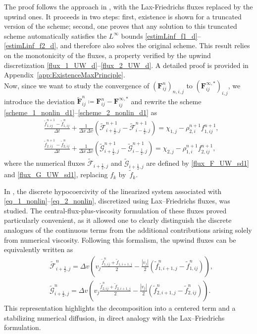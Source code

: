 \documentclass[reqno]{amsart}
\newcommand{\Dx}{\Delta x}
\newcommand{\Dv}{\Delta v}
\newcommand{\ft}{\widetilde{f}}
\newcommand{\Ft}{{\widetilde{F}}}
\newcommand{\fluxFt}{\widetilde{\mathcal{F}}}
\newcommand{\fluxGt}{\widetilde{\mathcal{G}}}
\newcommand{\Ftbf}{\mathbf{\Ft}}
\newcommand{\Fbf}{\mathbf{F}}
\newcommand{\iph}{{i+\frac{1}{2}}}
\newcommand{\imh}{{i-\frac{1}{2}}}
\numberwithin{equation}{section}
\begin{document}
The proof follows the approach in \cite{BCLR2025}, with the Lax-Friedrichs fluxes replaced by the upwind ones. It proceeds in two steps: first, existence is shown for a truncated version of the scheme; second,  one proves that any solution to this truncated scheme automatically satisfies the $L^\infty$ bounds \eqref{estimLinf_f1_d}--\eqref{estimLinf_f2_d}, and therefore also solves the original scheme. This result relies on the monotonicity of the fluxes, a property verified by the upwind discretization \eqref{flux_1_UW_d}--\eqref{flux_2_UW_d}. A detailed proof is provided in Appendix~\ref{app:ExistenceMaxPrinciple}.\\


Now, since we want to study the convergence of $(\Fbf^n_{ij})_{n,i,j}$ to $(\Fbf^{\infty,*}_{ij})_{i,j}$, we introduce the deviation $\Ftbf^n_{ij}\coloneq \Fbf^n_{ij}-\Fbf_{ij}^{\infty,*}$ and rewrite the scheme \eqref{scheme_1_nonlin_d1}--\eqref{scheme_2_nonlin_d1} as
\begin{align}
    & \frac{\ft_{1,ij}^{n+1}-\ft_{1,ij}^n}{\Delta t}+\frac{1}{\Dx\,\Dv}\left(\fluxFt_{\iph,j}^{n+1}-\fluxFt_{\imh,j}^{n+1}\right)=\chi_{1,j}-\rho_{2,i}^{n+1}f_{1,ij}^{n+1} ,\label{scheme_1_nonlin_d}\\
    &  \frac{\ft_{2,ij}^{n+1}-\ft_{2,ij}^n}{\Delta t}+\frac{1}{\Dx\,\Dv}\left(\fluxGt_{\iph,j}^{n+1}-\fluxGt_{\imh,j}^{n+1}\right)=\chi_{2,j}-\rho_{1,i}^{n+1}f_{2,ij}^{n+1},\label{scheme_2_nonlin_d}
\end{align}
where the numerical fluxes $\fluxFt_{\iph,j}$ and $\fluxGt_{\iph,j}$ are defined by \eqref{flux_F_UW_sd1} and \eqref{flux_G_UW_sd1}, replacing $f_k$ by~$\ft_k$.


In \cite{BCLR2025}, the discrete hypocoercivity of the linearized system associated with \eqref{eq_1_nonlin}–\eqref{eq_2_nonlin}, discretized using Lax–Friedrichs fluxes, was studied. The central-flux-plus-viscosity formulation of these fluxes proved particularly convenient, as it allowed one to clearly distinguish the discrete analogues of the continuous terms from the additional contributions arising solely from numerical viscosity. Following this formalism, the upwind fluxes can be equivalently written as
\begin{align}
    & \fluxFt^n_{\iph,j}=\Dv\left(v_j\frac{\ft^n_{1,ij}+\ft_{1,i+1,j}}{2}-\frac{|v_j|}{2}(\ft^n_{1,i+1,j}-\ft^n_{1,ij})\right),\label{flux_1_UW_d}\\
    & \fluxGt^n_{\iph,j}=\Dv\left(v_j\frac{\ft^n_{2,ij}+\ft_{2,i+1,j}}{2}-\frac{|v_j|}{2}(\ft^n_{2,i+1,j}-\ft^n_{2,ij})\right) \label{flux_2_UW_d}.
\end{align}
This representation highlights the decomposition into a centered term and a stabilizing numerical diffusion, in direct analogy with the Lax–Friedrichs formulation.
\end{document}
